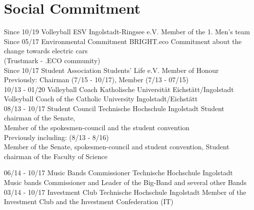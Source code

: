\documentclass[]{friggeri-cv}
\begin{document}
\section{Social Commitment}
\begin{entrylist}
     \entry
    {Since 10/19}
    {Volleyball}
    {ESV Ingolstadt-Ringsee e.V.}
    {Member of the 1. Men's team\\}
     \entry
    {Since 05/17}
    {Environmental Commitment}
    {BRIGHT.eco}
    {Commitment about the change towards electric cars \\(Trustmark - .ECO community)\\}
     \entry
    {Since 10/17}
    {Student Association}
    {Students' Life e.V.}
    {Member of Honour \\
    Previously: Chairman (7/15 - 10/17), Member (7/13 - 07/15)\\}
    \entry
    {10/13 - 01/20}
    {Volleyball Coach}
    {Katholische Universität Eichstätt/Ingolstadt}
    {Volleyball Coach of the Catholic University Ingolstadt/Eichstätt\\}
    \entry
    {08/13 - 10/17}
    {Student Council}
    {Technische Hochschule Ingolstadt}
    {Student chairman of the Senate,\\ Member of the spokesmen-council and the student convention\\ 
    Previously including: (8/13 - 8/16) \\Member of the Senate, spokesmen-council and student convention, Student chairman of the Faculty of Science}
    
    \entry
    {06/14 - 10/17}
    {Music Bands Commissioner}
    {Technische Hochschule Ingolstadt}
    {Music bands Commissioner and Leader of the Big-Band and several other Bands\\}
    \entry
    {03/14 - 10/17}
    {Investment Club}
    {Technische Hochschule Ingolstadt}
    {Member of the Investment Club and the Investment Confederation (IT)\\}
\end{entrylist}
\end{document}
